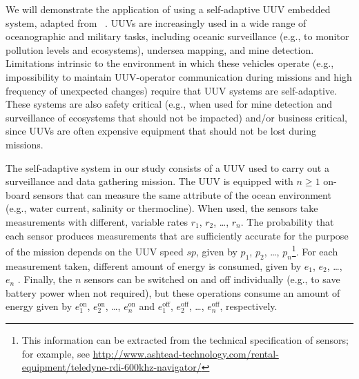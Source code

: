 
We will demonstrate the application of \approach using a self-adaptive UUV embedded system, adapted from~\cite{Gerasimou2014:SEAMS} . UUVs are increasingly used in a wide range of oceanographic and military tasks, including oceanic surveillance (e.g., to monitor pollution levels and ecosystems), undersea mapping, and mine detection. Limitations intrinsic to the environment in which these vehicles operate (e.g., impossibility  to maintain UUV-operator communication during missions and high frequency of unexpected changes) require that UUV systems are self-adaptive. These systems are also safety critical (e.g., when used for mine detection and surveillance of ecosystems that should not be impacted) and/or business critical, since UUVs are often expensive equipment that should not be lost during missions.

The self-adaptive system in our study consists of a UUV used to carry out a surveillance and data gathering mission. The UUV is equipped with $n \geq 1$ on-board sensors that can measure the same attribute of the ocean environment (e.g., water current, salinity or thermocline). When used, the sensors take measurements with different, variable rates $r_1$, $r_2$, \ldots, $r_n$. The probability that each sensor produces measurements that are sufficiently accurate for the purpose of the mission depends on the UUV speed $sp$, given by  $p_1$, $p_2$, \ldots, $p_n$\footnote{This information can be extracted from the technical specification of sensors; for example, see \url{http://www.ashtead-technology.com/rental-equipment/teledyne-rdi-600khz-navigator/}}. For each measurement taken, different amount of energy is consumed, given by $e_1$, $e_2$, \ldots, $e_n$ . %
Finally, the $n$ sensors can be switched on and off individually (e.g., to save battery power when not required), but these operations consume an amount of energy given by $e^\mathrm{on}_1$, $e^\mathrm{on}_2$, \ldots, $e^\mathrm{on}_n$ and $e^\mathrm{off}_1$, $e^\mathrm{off}_2$, \ldots, $e^\mathrm{off}_n$, respectively.

